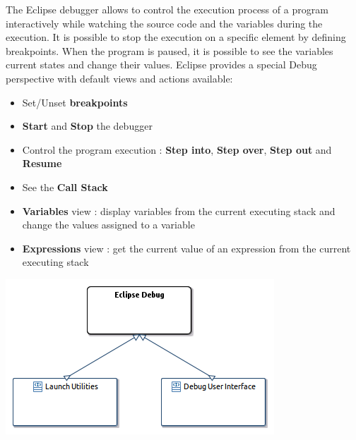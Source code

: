 \documentclass{gemoc} %
\begin{document}
The Eclipse debugger allows to control the execution process of a program interactively while watching the source code and the variables during the execution. It is possible to stop the execution on a specific element by defining breakpoints. When the program is paused, it is possible to see the variables current states and change their values.
\newline\newline Eclipse provides a special Debug perspective with default views and actions available:
\begin{itemize}
\item Set/Unset \textbf{breakpoints}
\item \textbf{Start} and \textbf{Stop} the debugger
\item Control the program execution : \textbf{Step into}, \textbf{Step over}, \textbf{Step out} and \textbf{Resume}
\item See the \textbf{Call Stack}
\item \textbf{Variables} view : display variables from the current executing stack and change the values assigned to a variable
\item \textbf{Expressions} view : get the current value of an expression from the current executing stack
\end{itemize}
\begin{center}
\includegraphics*[trim=0.0cm 0.0cm 0cm 0.0cm, clip=true]{../images/generated/Generated_Eclipse_Debug.png}
\end{center}
\end{document}
